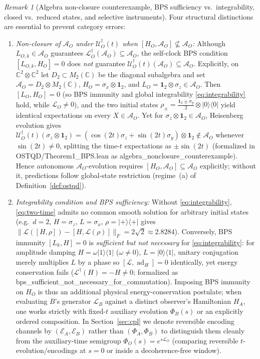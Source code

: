 \documentclass[11pt,a4paper]{article}
\theoremstyle{definition}
\theoremstyle{remark}
\newtheorem{remark}{Remark}
\newcommand{\ad}{\operatorname{ad}}
\newcommand{\cA}{\mathcal{A}}
\newcommand{\cL}{\mathcal{L}}
\newcommand{\cE}{\mathcal{E}}
\newcommand{\cU}{\mathcal{U}}
\newcommand{\bbC}{\mathbb{C}}
\newcommand{\1}{\mathbf{1}}
\newcommand{\normF}[1]{\|#1\|_F}
\newcommand{\code}[1]{{\footnotesize\ttfamily #1}}
\begin{document}
\begin{remark}[Algebra non-closure counterexample, BPS sufficiency vs.\ integrability, closed vs.\ reduced states, and selective instruments]\label{rem:def-precisions}
Four structural distinctions are essential to prevent category errors:
\begin{enumerate}
  \item \emph{Non-closure of $\cA_O$ under $\cU_O^\dagger(t)$ when $[H_O,\cA_O]\not\subseteq\cA_O$:} Although $L_{O,k}\in\cA_O$ guarantees $\cL_O^\dagger(\cA_O)\subseteq\cA_O$, the self-clock BPS condition $[L_{O,k}, H_O]=0$ does \emph{not} guarantee $\cU_O^\dagger(t)(\cA_O)\subseteq\cA_O$. Explicitly, on $\bbC^2\otimes\bbC^2$ let $D_2\subset M_2(\bbC)$ be the diagonal subalgebra and set $\cA_O = D_2\otimes M_2(\bbC)$, $H_O = \sigma_x\otimes\1_2$, and $L_O = \1_2\otimes\sigma_z\in\cA_O$. Then $[L_O,H_O]=0$ (so BPS immunity and global integrability \eqref{eq:integrability} hold, while $\cL_O\neq 0$), and the two initial states $\rho_\pm = \frac{\1_2\pm\sigma_y}{2}\otimes|0\rangle\langle 0|$ yield identical expectations on every $X\in\cA_O$. Yet for $\sigma_z\otimes\1_2\in\cA_O$, Heisenberg evolution gives $\cU_O^\dagger(t)(\sigma_z\otimes\1_2) = (\cos(2t)\sigma_z + \sin(2t)\sigma_y)\otimes\1_2 \notin \cA_O$ whenever $\sin(2t)\neq 0$, splitting the time-$t$ expectations as $\pm\sin(2t)$ (formalized in \code{OSTQD/Theorem1\_BPS.lean} as \code{algebra\_\allowbreak nonclosure\_\allowbreak counterexample}). Hence autonomous $\cA_O$-evolution requires $[H_O,\cA_O]\subseteq\cA_O$ explicitly; without it, predictions follow global-state restriction (regime~(a) of Definition~\ref{def:ostqd}).
  \item \emph{Integrability condition and BPS sufficiency:} Without \eqref{eq:integrability}, \eqref{eq:two-time} admits no common smooth solution for arbitrary initial states (e.g.\ $d=2$, $H = \sigma_z$, $L = \sigma_x$, $\rho = |+\rangle\langle +|$ gives $\normF{\cL([H,\rho]) - [H,\cL(\rho)]} = 2\sqrt{2} \approx 2.8284$). Conversely, BPS immunity $[L_k,H]=0$ is \emph{sufficient but not necessary} for \eqref{eq:integrability}: for amplitude damping $H = \omega|1\rangle\langle 1|$ ($\omega\neq 0$), $L = |0\rangle\langle 1|$, unitary conjugation merely multiplies $L$ by a phase so $[\cL,\ad_H]=0$ identically, yet energy conservation fails ($\cL^\dagger(H) = -H \neq 0$; formalized as \code{bps\_\allowbreak sufficient\_\allowbreak not\_\allowbreak necessary\_\allowbreak for\_\allowbreak commutation}). Imposing BPS immunity on $H_O$ is thus an additional physical energy-conservation postulate; when evaluating $B$'s generator $\cL_B$ against a distinct observer's Hamiltonian $H_A$, one works strictly with fixed-$t$ auxiliary evolution $\Phi_B(s)$ or an explicitly ordered composition. In Section~\ref{sec:cpl} we denote reversible encoding channels by $(\cE_A,\cE_B)$ rather than $(\Phi_A,\Phi_B)$ to distinguish them cleanly from the auxiliary-time semigroup $\Phi_O(s)=e^{s\cL_O}$ (comparing reversible $t$-evolution/encodings at $s=0$ or inside a decoherence-free window).

\end{enumerate}
\end{remark}
\end{document}

